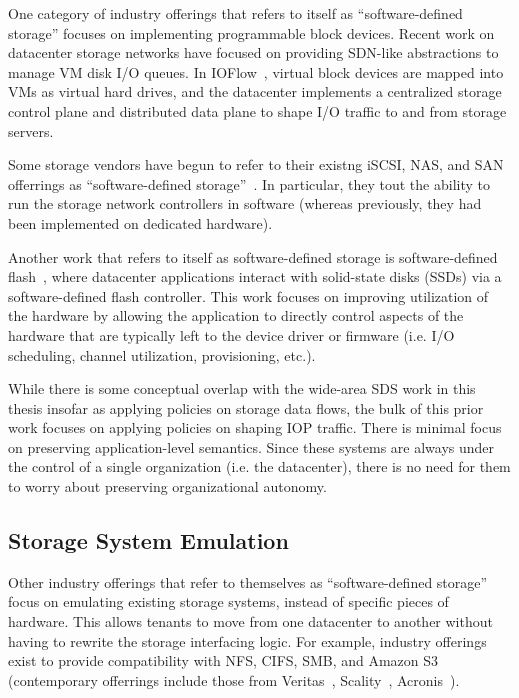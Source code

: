 One category of industry offerings that refers to itself as ``software-defined
storage'' focuses on implementing programmable block devices.
Recent work on datacenter storage networks have focused on providing SDN-like
abstractions to manage VM disk I/O queues.  In
IOFlow~\cite{ioflow}, virtual block devices
are mapped into VMs as virtual hard drives, and the datacenter implements a
centralized storage control plane and distributed data plane to shape I/O traffic to and
from storage servers.

Some storage vendors have begun to refer to their existng iSCSI, NAS, and SAN offerrings as
``software-defined storage''~\cite{computerweekly-storagebuzz}.  In particular,
they tout the ability to run the storage network controllers in
software (whereas previously, they had been implemented on dedicated hardware).

Another work that refers to itself as software-defined storage
is software-defined flash~\cite{sdf-baidu}, where
datacenter applications interact with solid-state disks (SSDs) via a
software-defined flash controller.  This work focuses on improving utilization
of the hardware by allowing the application to directly control aspects of the
hardware that are typically left to the device driver or firmware (i.e. I/O scheduling,
channel utilization, provisioning, etc.).

While there is some conceptual overlap with the wide-area SDS work in this
thesis insofar as applying policies on storage data flows,
the bulk of this prior work focuses on applying policies on shaping IOP traffic.  There
is minimal focus on preserving application-level semantics.  Since these systems are
always under the control of a single organization (i.e. the datacenter), there
is no need for them to worry about preserving organizational autonomy.

\subsection{Storage System Emulation}

Other industry offerings that refer to themselves as ``software-defined storage''
focus on emulating existing storage systems, instead of specific pieces of
hardware.  This allows tenants to move from one datacenter to another without having to
rewrite the storage interfacing logic.  For example, industry offerings exist to
provide compatibility with NFS, CIFS, SMB, and Amazon S3 (contemporary
offerrings include those from
Veritas~\cite{veritas}, Scality~\cite{scality}, Acronis~\cite{acronis}).

